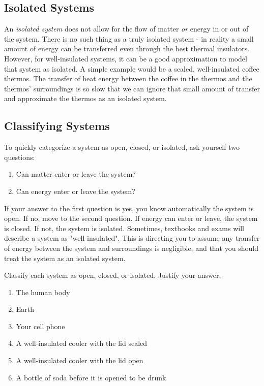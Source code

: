 \subsection{Isolated Systems}
An \textit{isolated system} does not allow for the flow of matter \textit{or} 
energy in or out of the system. There is no such thing as a truly isolated system
- in reality a small amount of energy can be transferred even through the best 
thermal insulators. However, for well-insulated systems, it can be a good 
approximation to model that system as isolated. A simple example would be a 
sealed, well-insulated coffee thermos. The transfer of heat energy between the 
coffee in the thermos and the thermos' surroundings is so slow that we can ignore
that small amount of transfer and approximate the thermos as an isolated system. 

\subsection{Classifying Systems}
To quickly categorize a system as open, closed, or isolated, ask yourself two questions:
\begin{enumerate}
\item Can matter enter or leave the system?
\item Can energy enter or leave the system?
\end{enumerate}

If your answer to the first question is yes, you know automatically the system 
is open. If no, move to the second question. If energy can enter or leave, the 
system is closed. If not, the system is isolated. Sometimes, textbooks and exams 
will describe a system as "well-insulated". This is directing you to assume any 
transfer of energy between the system and surroundings is negligible, and that 
you should treat the system as an isolated system. 

\begin{Exercise}[title = {Open, Closed, and Isolated Systems}, label = systems]
Classify each system as open, closed, or isolated. Justify your answer. 
\begin{enumerate}
\item The human body
\item Earth
\item Your cell phone
\item A well-insulated cooler with the lid sealed
\item A well-insulated cooler with the lid open
\item A bottle of soda before it is opened to be drunk
\end{enumerate}
\end{Exercise}

